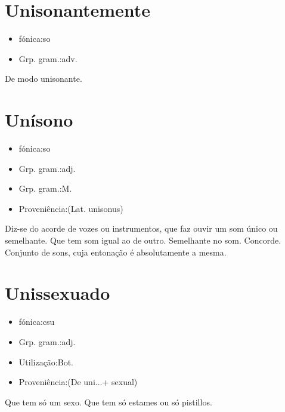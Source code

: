 \documentclass{article}
\begin{document}
\section{Unisonantemente}
\begin{itemize}
\item {fónica:so}
\end{itemize}
\begin{itemize}
\item {Grp. gram.:adv.}
\end{itemize}
De modo unisonante.
\section{Unísono}
\begin{itemize}
\item {fónica:so}
\end{itemize}
\begin{itemize}
\item {Grp. gram.:adj.}
\end{itemize}
\begin{itemize}
\item {Grp. gram.:M.}
\end{itemize}
\begin{itemize}
\item {Proveniência:(Lat. \textunderscore unisonus\textunderscore )}
\end{itemize}
Diz-se do acorde de vozes ou instrumentos, que faz ouvir um som único ou semelhante.
Que tem som igual ao de outro.
Semelhante no som.
Concorde.
Conjunto de sons, cuja entonação é absolutamente a mesma.
\section{Unissexuado}
\begin{itemize}
\item {fónica:csu}
\end{itemize}
\begin{itemize}
\item {Grp. gram.:adj.}
\end{itemize}
\begin{itemize}
\item {Utilização:Bot.}
\end{itemize}
\begin{itemize}
\item {Proveniência:(De \textunderscore uni...\textunderscore  + \textunderscore sexual\textunderscore )}
\end{itemize}
Que tem só um sexo.
Que tem só estames ou só pistillos.
\end{document}
